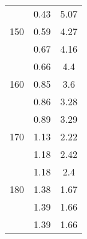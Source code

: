\begin{table}[H]
\begin{tabular}{S[table-format = 2.0] S S}
		                 & 0.43      & 5.07      \\
		150              & 0.59      & 4.27      \\
		                 & 0.67      & 4.16      \\
		                 & 0.66      & 4.4       \\
		160              & 0.85      & 3.6       \\
		                 & 0.86      & 3.28      \\
		                 & 0.89      & 3.29      \\
		170              & 1.13      & 2.22      \\
		                 & 1.18      & 2.42      \\
		                 & 1.18      & 2.4       \\
		180              & 1.38      & 1.67      \\
		                 & 1.39      & 1.66      \\
		                 & 1.39      & 1.66      \\

		\bottomrule
	\end{tabular}
	\caption{}\label{}
\end{table}
